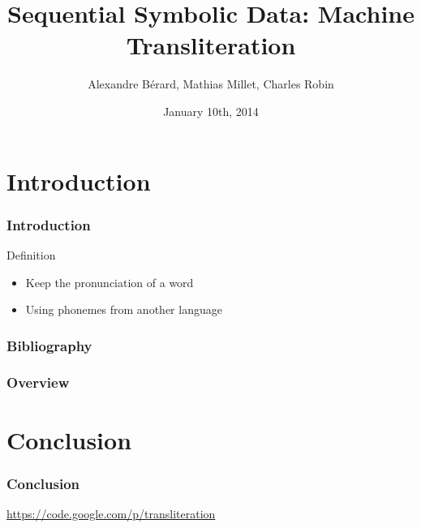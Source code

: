 \documentclass{beamer}
\title[Machine Transliteration]{Sequential Symbolic Data: Machine Transliteration}
\author[A.~Bérard, M.~Millet, C.~Robin]{Alexandre Bérard, Mathias Millet, Charles Robin}
\date{January 10th, 2014}
\begin{document}
\begin{frame}
\titlepage
\end{frame}

\section{Introduction}    
\begin{frame}
    \frametitle{Introduction}
	
	\begin{block}{Definition}
	    \begin{itemize}
    		\item Keep the pronunciation of a word
    		\item Using phonemes from another language
    		\end{itemize}
    \end{block}	    
    
\end{frame}

\begin{frame}
    \frametitle{Bibliography}
    {\fontsize{0.8em}{1em}
    \nocite{*}
    
    }
\end{frame}

\begin{frame}
    \frametitle{Overview}
\end{frame}

\section{Conclusion}
\begin{frame}
    \frametitle{Conclusion}
    \url{https://code.google.com/p/transliteration}
\end{frame}
\end{document}
